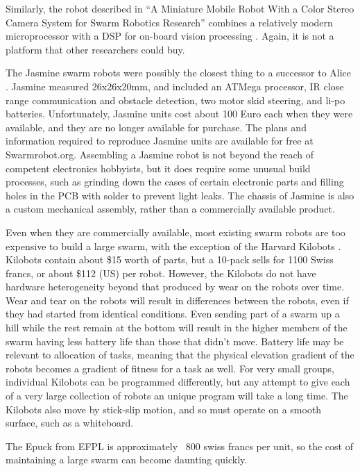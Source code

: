 \documentclass[]{article}
\begin{document}
Similarly, the robot described in ``A Miniature Mobile Robot With a Color Stereo Camera System for Swarm Robotics Research'' combines a relatively modern microprocessor with a DSP for on-board vision processing \cite{haverinen2005miniature}. 
Again, it is not a platform that other researchers could buy.

The Jasmine swarm robots were possibly the closest thing to a successor to Alice  \cite{kernbach2011swarmrobot}.
Jasmine measured 26x26x20mm, and included an ATMega processor, IR close range communication and obstacle detection, two motor skid steering, and li-po batteries.
Unfortunately, Jasmine units cost about 100 Euro each when they were available, and they are no longer available for purchase. 
The plans and information required to reproduce Jasmine units are available for free at Swarmrobot.org.
Assembling a Jasmine robot is not beyond the reach of competent electronics hobbyists, but it does require some unusual build processes, such as grinding down the cases of certain electronic parts and filling holes in the PCB with solder to prevent light leaks. 
The chassis of Jasmine is also a custom mechanical assembly, rather than a commercially available product. 

Even when they are commercially available, most existing swarm robots are too expensive to build a large swarm, with the exception of the Harvard Kilobots  \cite{rubenstein2014kilobot}. 
Kilobots contain about \$15 worth of parts, but a 10-pack sells for 1100 Swiss francs, or about \$112 (US) per robot. 
However, the Kilobots do not have hardware heterogeneity beyond that produced by wear on the robots over time. 
Wear and tear on the robots will result in differences between the robots, even if they had started from identical conditions. 
Even sending part of a swarm up a hill while the rest remain at the bottom will result in the higher members of the swarm having less battery life than those that didn't move. 
Battery life may be relevant to allocation of tasks, meaning that the physical elevation gradient of the robots becomes a gradient of fitness for a task as well. 
For very small groups, individual Kilobots can be programmed differently, but any attempt to give each of a very large collection of robots an unique program will take a long time. 
The Kilobots also move by stick-slip motion, and so must operate on a smooth surface, such as a whiteboard. 

The Epuck from EFPL is approximately ~800 swiss francs per unit, so the cost of maintaining a large swarm can become daunting quickly. 
\end{document}
